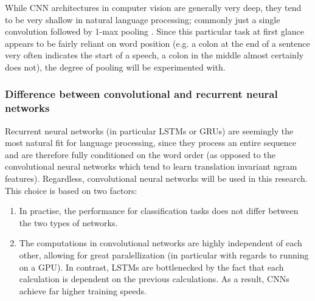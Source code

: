 While CNN architectures in computer vision are generally very deep, they tend to
be very shallow in natural language processing; commonly just a single
convolution followed by 1-max pooling \citep{zhang2015conv}. Since this
particular task at first glance appears to be fairly reliant on word position
(e.g. a colon at the end of a sentence very often indicates the start of a
speech, a colon in the middle almost certainly does not), the degree of pooling
will be experimented with.

\subsubsection{Difference between convolutional and recurrent neural networks}
Recurrent neural networks (in particular LSTMs or GRUs) are seemingly the most
natural fit for language processing, since they process an entire sequence and
are therefore fully conditioned on the word order (as opposed to the
convolutional neural networks which tend to learn translation invariant ngram
features). Regardless, convolutional neural networks will be used in this
research. This choice is based on two factors:
\begin{enumerate}
\item In practise, the performance for classification tasks does not differ
  between the two types of networks.\citep{cnnrnn}
\item The computations in convolutional networks are highly independent of
  each other, allowing for great paralellization (in particular with regards to
  running on a GPU). In contrast, LSTMs are bottlenecked by the fact that each
  calculation is dependent on the previous calculations. As a result, CNNs
  achieve far higher training speeds.\citep{facebook}
\end{enumerate}


